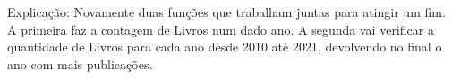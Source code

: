 \begin{DoxyEnumerate}
\begin{DoxyCode}{0}
\DoxyCodeLine{}
\DoxyCodeLine{}
\DoxyCodeLine{}
\DoxyCodeLine{        \}}
\DoxyCodeLine{}
\DoxyCodeLine{    \}}
\DoxyCodeLine{}
\DoxyCodeLine{}
\DoxyCodeLine{\}}
\end{DoxyCode}
 Explicação\+: Novamente duas funções que trabalham juntas para atingir um fim. A primeira faz a contagem de Livros num dado ano. A segunda vai verificar a quantidade de Livros para cada ano desde 2010 até 2021, devolvendo no final o ano com mais publicações. 
\end{DoxyEnumerate}